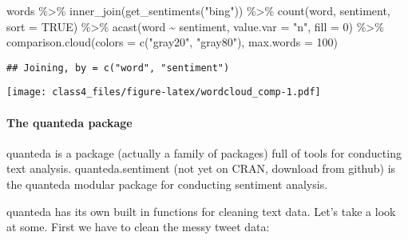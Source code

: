 \documentclass[
]{article}
\newenvironment{Shaded}{\begin{snugshade}}{\end{snugshade}}
\newcommand{\AttributeTok}[1]{\textcolor[rgb]{0.77,0.63,0.00}{#1}}
\newcommand{\CommentTok}[1]{\textcolor[rgb]{0.56,0.35,0.01}{\textit{#1}}}
\newcommand{\ConstantTok}[1]{\textcolor[rgb]{0.00,0.00,0.00}{#1}}
\newcommand{\DecValTok}[1]{\textcolor[rgb]{0.00,0.00,0.81}{#1}}
\newcommand{\FunctionTok}[1]{\textcolor[rgb]{0.00,0.00,0.00}{#1}}
\newcommand{\NormalTok}[1]{#1}
\newcommand{\OtherTok}[1]{\textcolor[rgb]{0.56,0.35,0.01}{#1}}
\newcommand{\SpecialCharTok}[1]{\textcolor[rgb]{0.00,0.00,0.00}{#1}}
\newcommand{\StringTok}[1]{\textcolor[rgb]{0.31,0.60,0.02}{#1}}
\begin{document}
\begin{Shaded}
\begin{Highlighting}[]
\NormalTok{words }\SpecialCharTok{\%\textgreater{}\%}
\FunctionTok{inner\_join}\NormalTok{(}\FunctionTok{get\_sentiments}\NormalTok{(}\StringTok{"bing"}\NormalTok{)) }\SpecialCharTok{\%\textgreater{}\%}
\FunctionTok{count}\NormalTok{(word, sentiment, }\AttributeTok{sort =} \ConstantTok{TRUE}\NormalTok{) }\SpecialCharTok{\%\textgreater{}\%}
\FunctionTok{acast}\NormalTok{(word }\SpecialCharTok{\textasciitilde{}}\NormalTok{ sentiment, }\AttributeTok{value.var =} \StringTok{"n"}\NormalTok{, }\AttributeTok{fill =} \DecValTok{0}\NormalTok{) }\SpecialCharTok{\%\textgreater{}\%}
\FunctionTok{comparison.cloud}\NormalTok{(}\AttributeTok{colors =} \FunctionTok{c}\NormalTok{(}\StringTok{"gray20"}\NormalTok{, }\StringTok{"gray80"}\NormalTok{),}
                   \AttributeTok{max.words =} \DecValTok{100}\NormalTok{)}
\end{Highlighting}
\end{Shaded}

\begin{verbatim}
## Joining, by = c("word", "sentiment")
\end{verbatim}

\texttt{[image: class4\_files/figure-latex/wordcloud\_comp-1.pdf]}

\hypertarget{the-quanteda-package}{%
\paragraph{The quanteda package}\label{the-quanteda-package}}

quanteda is a package (actually a family of packages) full of tools for
conducting text analysis. quanteda.sentiment (not yet on CRAN, download
from github) is the quanteda modular package for conducting sentiment
analysis.

quanteda has its own built in functions for cleaning text data. Let's
take a look at some. First we have to clean the messy tweet data:

\begin{Shaded}
\end{Shaded}
\end{document}

